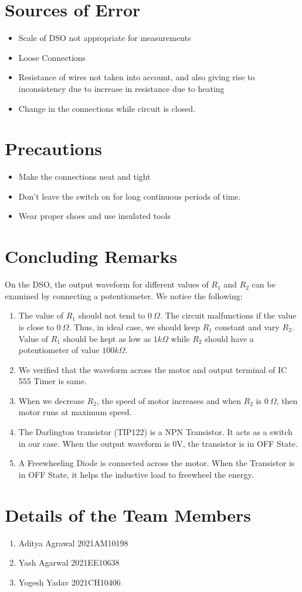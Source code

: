 \documentclass{article}
\begin{document}
\section{Sources of Error}
\begin{itemize}
\item Scale of DSO not appropriate for measurements
\item Loose Connections
\item Resistance of wires not taken into account, and also giving rise to inconsistency due to increase in resistance due to heating
\item Change in the connections while circuit is closed.

\end{itemize}

\section{Precautions}

\begin{itemize}
\item Make the connections neat and tight
\item Don’t leave the switch on for long continuous periods of time.
\item Wear proper shoes and use insulated tools
\end{itemize}

\section{Concluding Remarks}
On the DSO, the output waveform for different values of $R_1$ and $R_2$ can be examined by connecting a potentiometer. We notice the following:
\begin{enumerate}
    \item The value of $R_1$ should not tend to $0 \ \Omega$. The circuit malfunctions if the value is close to $0 \ \Omega$. Thus, in ideal case, we should keep $R_1$ constant and vary $R_2$. Value of $R_1$ should be kept as low as $1k\Omega$ while $R_2$ should have a potentiometer of value $100k\Omega$.
    \item We verified that the waveform across the motor and output terminal of IC 555 Timer is same.
    \item When we decrease $R_2$, the speed of motor increases and when $R_2$ is $0 \ \Omega$, then motor runs at maximum speed.
    \item The Darlington transistor (TIP122) is a NPN Transistor. It acts as a switch in our case. When the output waveform is 0V, the transistor is in OFF State.
    \item A Freewheeling Diode is connected across the motor. When the Transistor is in OFF State, it helps the inductive load to freewheel the energy.
\end{enumerate}

\vspace{20px}

\section{Details of the Team Members}
\begin{enumerate}
    \item Aditya Agrawal 2021AM10198
    \item Yash Agarwal 2021EE10638
    \item Yogesh Yadav 2021CH10406
\end{enumerate}
\end{document}
